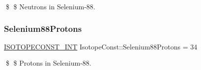 \$ \$ Neutrons in Selenium-\/88. \mbox{\label{group___isotope_const-_selenium-_se88_ga676d9ceb98f022b5d58b86a500754370}} 
\subsubsection{\texorpdfstring{Selenium88\+Protons}{Selenium88Protons}}
{\footnotesize\ttfamily \mbox{\hyperlink{group___isotope_const-_macros_ga5f18360b3e99483a35c32d789e62621c}{I\+S\+O\+T\+O\+P\+E\+C\+O\+N\+S\+T\+\_\+\+I\+NT}} Isotope\+Const\+::\+Selenium88\+Protons = 34}

\$ \$ Protons in Selenium-\/88. 
